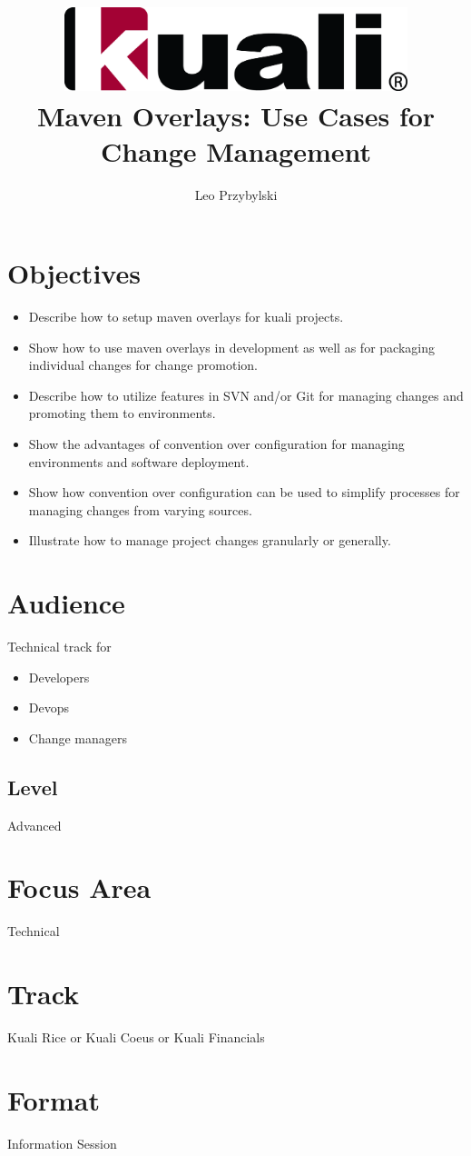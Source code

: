 \documentclass[12pt,notitlepage]{article}
\author{Leo Przybylski}
\title{\includegraphics[width=0.75\textwidth]{kuali_base.png}\\Maven
  Overlays: Use Cases for Change Management}
\date{}
\begin{document}
\maketitle
{}

\section{Objectives}
\begin{itemize}
\item Describe how to setup maven overlays for kuali projects.
\item Show how to use maven overlays in development as well as for packaging
  individual changes for change promotion.
\item Describe how to utilize features in SVN and/or Git for managing
  changes and promoting them to environments.
\item Show the advantages of convention over configuration for
  managing environments and software deployment.
\item Show how convention over configuration can be used to simplify
  processes for managing changes from varying sources.
\item Illustrate how to manage project changes granularly or generally.
\end{itemize}

\section{Audience}
Technical track for
\begin{itemize}
\item Developers
\item Devops
\item Change managers
\end{itemize}

\subsection{Level}
Advanced

\section{Focus Area}
Technical

\section{Track}
Kuali Rice or Kuali Coeus or Kuali Financials

\section{Format}
Information Session
\end{document}
